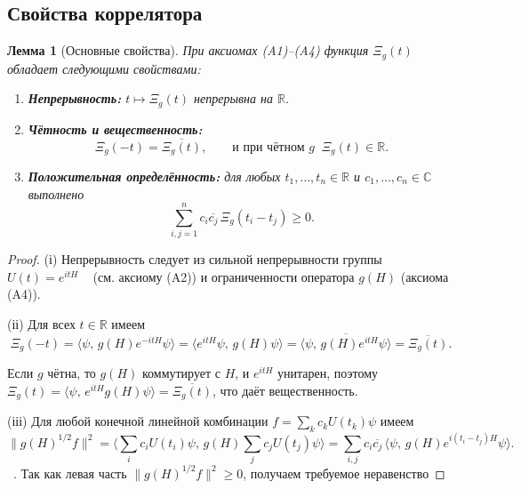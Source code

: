 \documentclass{article}
\numberwithin{equation}{section}
\theoremstyle{plain}
\newtheorem{lemma}{Лемма}
\theoremstyle{definition}
\theoremstyle{remark}
\begin{document}
\subsection{Свойства коррелятора}
\label{subsec:correlator_props}

\begin{lemma}[Основные свойства]
\label{lem:correlator_props}
При аксиомах (A1)–(A4) функция $\Xi_g(t)$ обладает следующими свойствами:
\begin{enumerate}[label=(\roman*), leftmargin=2.2em]
  \item \textbf{Непрерывность:} $t\mapsto \Xi_g(t)$ непрерывна на $\mathbb R$.
  \item \textbf{Чётность и вещественность:}
  \begin{equation}
  \Xi_g(-t)=\overline{\Xi_g(t)}, \qquad 
  \text{и при чётном $g$}\;\; \Xi_g(t)\in\mathbb R.
  \end{equation}
  \item \textbf{Положительная определённость:} для любых $t_1,\dots,t_n\in\mathbb R$ и $c_1,\dots,c_n\in\mathbb C$ выполнено
  \begin{equation}
  \sum_{i,j=1}^n c_i\overline{c_j}\,\Xi_g(t_i-t_j)\ge 0.
  \end{equation}
\end{enumerate}
\end{lemma}

\begin{proof}
(і) Непрерывность следует из сильной непрерывности группы $U(t)=e^{itH}$ ~\cite{Yosida1980} (см. аксиому (A2)) и ограниченности оператора $g(H)$ (аксиома (A4)).  

(іі) Для всех $t\in\mathbb R$ имеем
\begin{equation}
\Xi_g(-t)
=\langle\psi,\,g(H)e^{-itH}\psi\rangle
=\langle e^{itH}\psi,\,g(H)\psi\rangle
=\overline{\langle\psi,\,g(H)e^{itH}\psi\rangle}
=\overline{\Xi_g(t)}.
\label{eq:QSSC0012}
\end{equation}

Если $g$ чётна, то $g(H)$ коммутирует с $H$, и $e^{itH}$ унитарен, поэтому $\Xi_g(t)=\langle \psi,\,e^{itH}g(H)\psi\rangle=\overline{\Xi_g(t)}$, что даёт вещественность.

(ііі) Для любой конечной линейной комбинации $f=\sum_k c_k U(t_k)\psi$ имеем
\begin{equation}
\|g(H)^{1/2} f\|^2
=\Big\langle \sum_i c_i U(t_i)\psi,\,
  g(H)\sum_j c_j U(t_j)\psi\Big\rangle
=\sum_{i,j} c_i\overline{c_j}\,
  \langle \psi,\,g(H)e^{i(t_i-t_j)H}\psi\rangle.
\label{eq:QSSC0013}
\end{equation}
 ~\cite{AkhiezerGlazman1993}.
Так как левая часть $\|g(H)^{1/2} f\|^2\ge0$, получаем требуемое неравенство
\end{proof}
\end{document}

